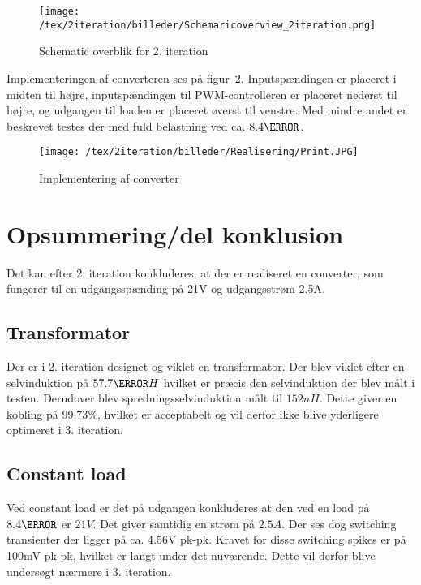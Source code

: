 \begin{figure}[H]
	\center
	\texttt{[image: /tex/2iteration/billeder/Schemaricoverview\_2iteration.png]}
	\caption{Schematic overblik for 2. iteration}
	\label{fig:Schematic2iteration}
\end{figure}

\noindent Implementeringen af converteren ses på figur~\ref{fig:Mini_Mount}. Inputspændingen er placeret i midten til højre, inputspændingen til PWM-controlleren er placeret nederst til højre, og udgangen til loaden er placeret øverst til venstre. Med mindre andet er beskrevet testes der med fuld belastning ved ca. $8.4\ohm$.

\begin{figure}[H]
	\center
	\texttt{[image: /tex/2iteration/billeder/Realisering/Print.JPG]}
	\caption{Implementering af converter}
	\label{fig:Mini_Mount}
\end{figure}



\section{Opsummering/del konklusion}
Det kan efter 2. iteration konkluderes, at der er realiseret en converter, som fungerer til en udgangsspænding på 21V og udgangsstrøm 2.5A.

\subsection{Transformator}
Der er i 2. iteration designet og viklet en transformator. Der blev viklet efter en selvinduktion på $57.7\micro H$ hvilket er præcis den selvinduktion der blev målt i testen. Derudover blev spredningsselvinduktion målt til $152nH$. Dette giver en kobling på $99.73\percent$, hvilket er acceptabelt og vil derfor ikke blive yderligere optimeret i 3. iteration. 

\subsection{Constant load}
Ved constant load er det på udgangen konkluderes at den ved en load på $8.4\ohm$ er $21V$. Det giver samtidig en strøm på $2.5A$. Der ses dog switching transienter der ligger på ca. 4.56V pk-pk. Kravet for disse switching spikes er på 100mV pk-pk, hvilket er langt under det nuværende. Dette vil derfor blive undersøgt nærmere i 3. iteration.



